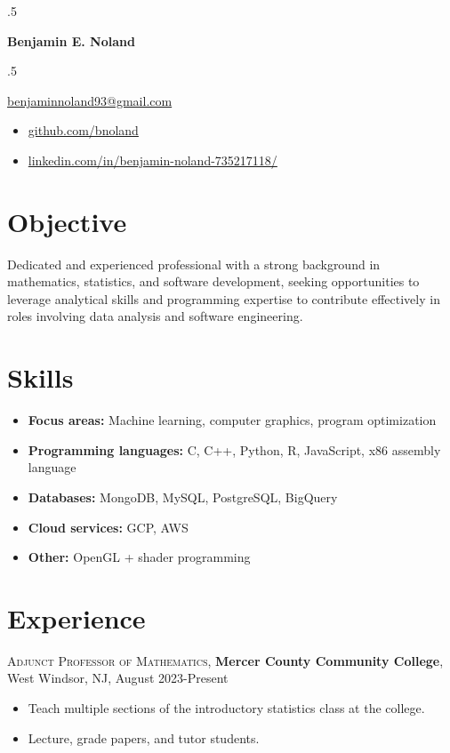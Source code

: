 \documentclass[letterpaper,10pt]{article}
\begin{document}
\begin{multicols}{2}
  \moveleft.5\hoffset\centerline{\Large\bf Benjamin E. Noland}
  \smallskip
  \moveleft.5\hoffset\centerline{\href{mailto:benjaminnoland93@gmail.com}{benjaminnoland93@gmail.com}}
  \columnbreak
  \begin{itemize}[label={}]
    \item \href{https://www.github.com/bnoland}{github.com/bnoland}
    \item \href{https://www.linkedin.com/in/benjamin-noland-735217118/}{linkedin.com/in/benjamin-noland-735217118/}
  \end{itemize}
\end{multicols}

\section*{Objective}

Dedicated and experienced professional with a strong background in mathematics, statistics, and software development,
seeking opportunities to leverage analytical skills and programming expertise to contribute effectively in roles
involving data analysis and software engineering.

\section*{Skills}

\begin{itemize}
  \item \textbf{Focus areas:} Machine learning, computer graphics, program optimization
  \item \textbf{Programming languages:} C, C++, Python, R, JavaScript, x86 assembly language
  \item \textbf{Databases:} MongoDB, MySQL, PostgreSQL, BigQuery
  \item \textbf{Cloud services:} GCP, AWS
  \item \textbf{Other:} OpenGL + shader programming
\end{itemize}

\section*{Experience}

\textsc{Adjunct Professor of Mathematics}, \textbf{Mercer County Community College}, West Windsor, NJ, August 2023-Present
\begin{itemize}
  \item Teach multiple sections of the introductory statistics class at the college.
  \item Lecture, grade papers, and tutor students.
\end{itemize}
\end{document}
